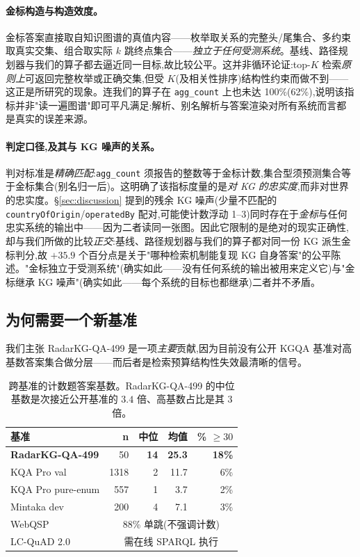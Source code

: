 \documentclass[11pt,a4paper]{article}
\newcommand{\qtype}[1]{\texttt{\small #1}}
\begin{document}
\paragraph{金标构造与构造效度。}
金标答案直接取自知识图谱的真值内容——枚举取关系的完整头/尾集合、多约束取真实交集、组合取实际 $k$ 跳终点集合——\emph{独立于任何受测系统}。基线、路径规划器与我们的算子都去逼近同一目标,故比较公平。这并非循环论证:top-$K$ 检索\emph{原则上}可返回完整枚举或正确交集,但受 $K$(及相关性排序)结构性约束而做不到——这正是所研究的现象。连我们的算子在 \qtype{agg\_count} 上也未达 100\%(62\%),说明该指标并非"读一遍图谱"即可平凡满足:解析、别名解析与答案渲染对所有系统而言都是真实的误差来源。

\paragraph{判定口径,及其与 KG 噪声的关系。}
判对标准是\emph{精确匹配}:\qtype{agg\_count} 须报告的整数等于金标计数,集合型须预测集合等于金标集合(别名归一后)。这明确了该指标度量的是\emph{对 KG 的忠实度},而非对世界的忠实度。\S\ref{sec:discussion} 提到的残余 KG 噪声(少量不匹配的 \texttt{countryOfOrigin}/\texttt{operatedBy} 配对,可能使计数浮动 1--3)同时存在于\emph{金标}与任何忠实系统的输出中——因为二者读同一张图。因此它限制的是绝对的现实正确性,却与我们所做的比较\emph{正交}:基线、路径规划器与我们的算子都对同一份 KG 派生金标判分,故 $+35.9$ 个百分点是关于"哪种检索机制能复现 KG 自身答案"的公平陈述。"金标独立于受测系统"(确实如此——没有任何系统的输出被用来定义它)与"金标继承 KG 噪声"(确实如此——每个系统的目标也都继承)二者并不矛盾。

\subsection{为何需要一个新基准}
\label{sec:bench-design}
我们主张 RadarKG-QA-499 是一项\emph{主要}贡献,因为目前没有公开 KGQA 基准对高基数答案集合做分层——而后者是检索预算结构性失效最清晰的信号。

\begin{table}[h]
\centering\small
\caption{跨基准的计数题答案基数。RadarKG-QA-499 的中位基数是次接近公开基准的 $3.4$ 倍、高基数占比是其 $3$ 倍。}
\label{tab:bench-distribution}
\begin{tabular}{l r r r r}
\toprule
\textbf{基准} & \textbf{n} & \textbf{中位} & \textbf{均值} & \textbf{\% $\!\geq\! 30$} \\
\midrule
\textbf{RadarKG-QA-499} & 50 & \textbf{14} & \textbf{25.3} & \textbf{18\%} \\
KQA Pro val            & 1318 & 2 & 11.7 & 6\% \\
KQA Pro pure-enum      & 557 & 1 & 3.7  & 2\% \\
Mintaka dev            & 200 & 4 & 7.1  & 3\% \\
WebQSP                 & \multicolumn{4}{c}{88\% 单跳(不强调计数)} \\
LC-QuAD 2.0            & \multicolumn{4}{c}{需在线 SPARQL 执行} \\
\bottomrule
\end{tabular}
\end{table}
\end{document}
